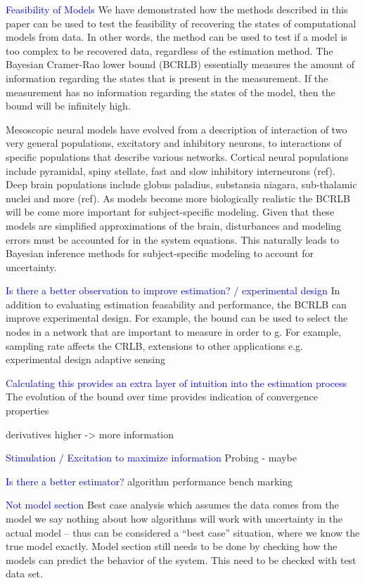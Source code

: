 \documentclass{article}
\newcommand{\brian}[1]{\textcolor{blue}{#1}}
\begin{document}
\brian{Feasibility of Models}
We have demonstrated how the methods described in this paper can be used to test the feasibility of recovering the states of computational models from data. In other words, the method can be used to test if a model is too complex to be recovered data, regardless of the estimation method. The Bayesian Cramer-Rao lower bound (BCRLB) essentially measures the amount of information regarding the states that is present in the measurement. If the measurement has no information regarding the states of the model, then the bound will be infinitely high. 

Mesoscopic neural models have evolved from a description of interaction of two very general populations, excitatory and inhibitory neurons, to interactions of specific populations that describe various networks. Cortical neural populations include pyramidal, spiny stellate, fast and slow inhibitory interneurons (ref). Deep brain populations include globus paladius, substansia niagara, sub-thalamic nuclei and more (ref). As models become more biologically realistic the BCRLB will be come more important for subject-specific modeling. Given that these models are simplified approximations of the brain, disturbances and modeling errors must be accounted for in the system equations. This naturally leads to Bayesian inference methods for subject-specific modeling to account for uncertainty. 

\brian{Is there a better observation to improve estimation? / experimental design}
In addition to evaluating estimation feasability and performance, the BCRLB can improve experimental design. For example, the bound can be used to select the nodes in a network that are important to measure in order to g. For example, 
sampling rate affects the CRLB, extensions to other applications e.g. experimental design
adaptive sensing

\brian{Calculating this provides an extra layer of intuition into the estimation process}
The evolution of the bound over time provides indication of convergence properties

derivatives higher -> more information

\brian{Stimulation / Excitation to maximize information}
Probing - maybe

\brian{Is there a better estimator?}
algorithm performance bench marking



\brian{Not model section}
Best case analysis which assumes the data comes from the model
we say nothing about how algorithms will work with uncertainty in the actual model -- thus can be considered a ``best case'' situation, where we know the true model exactly.
Model section still needs to be done by checking how the models can predict the behavior of the system. This need to be checked with test data set.
\end{document}
